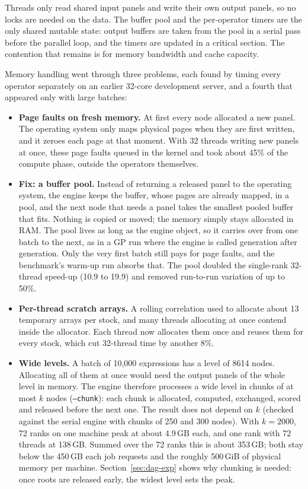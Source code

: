 \documentclass[11pt,a4paper]{article}
\newcommand{\code}[1]{\texttt{#1}}
\begin{document}
Threads only read shared input panels and write their own output panels, so no locks are needed on the data. The buffer pool and the per-operator timers are the only shared mutable state: output buffers are taken from the pool in a serial pass before the parallel loop, and the timers are updated in a critical section. The contention that remains is for memory bandwidth and cache capacity.

Memory handling went through three problems, each found by timing every operator separately on an earlier 32-core development server, and a fourth that appeared only with large batches:
\begin{itemize}[nosep]
  \item \textbf{Page faults on fresh memory.} At first every node allocated a new panel. The operating system only maps physical pages when they are first written, and it zeroes each page at that moment. With 32 threads writing new panels at once, these page faults queued in the kernel and took about 45\% of the compute phase, outside the operators themselves.
  \item \textbf{Fix: a buffer pool.} Instead of returning a released panel to the operating system, the engine keeps the buffer, whose pages are already mapped, in a pool, and the next node that needs a panel takes the smallest pooled buffer that fits. Nothing is copied or moved; the memory simply stays allocated in RAM. The pool lives as long as the engine object, so it carries over from one batch to the next, as in a GP run where the engine is called generation after generation. Only the very first batch still pays for page faults, and the benchmark's warm-up run absorbs that. The pool doubled the single-rank 32-thread speed-up (10.9 to 19.9) and removed run-to-run variation of up to 50\%.
  \item \textbf{Per-thread scratch arrays.} A rolling correlation used to allocate about 13 temporary arrays per stock, and many threads allocating at once contend inside the allocator. Each thread now allocates them once and reuses them for every stock, which cut 32-thread time by another 8\%.
  \item \textbf{Wide levels.} A batch of 10{,}000 expressions has a level of 8614 nodes. Allocating all of them at once would need the output panels of the whole level in memory. The engine therefore processes a wide level in chunks of at most $k$ nodes (\code{--chunk}): each chunk is allocated, computed, exchanged, scored and released before the next one. The result does not depend on $k$ (checked against the serial engine with chunks of 250 and 300 nodes). With $k=2000$, 72 ranks on one machine peak at about 4.9\,GB each, and one rank with 72 threads at 138\,GB. Summed over the 72 ranks this is about 353\,GB; both stay below the 450\,GB each job requests and the roughly 500\,GiB of physical memory per machine. Section~\ref{sec:dag-exp} shows why chunking is needed: once roots are released early, the widest level sets the peak.
\end{itemize}
\end{document}
